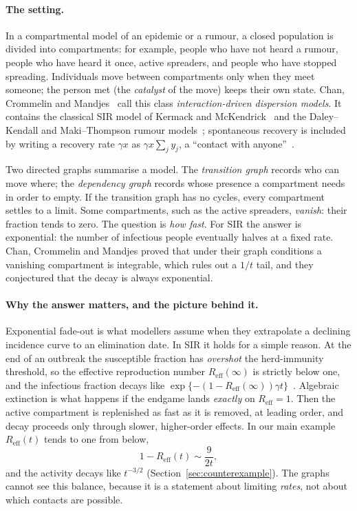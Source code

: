 \documentclass[11pt,a4paper]{article}
\theoremstyle{definition}\newtheorem{definition}[theorem]{Definition}
\theoremstyle{remark}\newtheorem{remark}[theorem]{Remark}
\begin{document}
\paragraph{The setting.}
In a compartmental model of an epidemic or a rumour, a closed population
is divided into compartments: for example, people who have not heard a
rumour, people who have heard it once, active spreaders, and people who
have stopped spreading. Individuals move between compartments only when
they meet someone; the person met (the \emph{catalyst} of the move) keeps
their own state. Chan, Crommelin and Mandjes~\cite{CCM} call this class
\emph{interaction-driven dispersion models}. It contains the classical
SIR model of Kermack and McKendrick~\cite{KermackMcKendrick} and the
Daley--Kendall and Maki--Thompson rumour models~\cite{DaleyKendall,MakiThompson}; spontaneous recovery is
included by writing a recovery rate $\gamma x$ as $\gamma x\sum_j y_j$,
a ``contact with anyone''~\cite[eq.~(8), p.~9]{CCM}.

Two directed graphs summarise a model. The \emph{transition graph}
records who can move where; the \emph{dependency graph} records whose
presence a compartment needs in order to empty. If the transition graph
has no cycles, every compartment settles to a limit. Some compartments,
such as the active spreaders, \emph{vanish}: their fraction tends to
zero. The question is \emph{how fast}. For SIR the answer is
exponential: the number of infectious people eventually halves at a
fixed rate. Chan, Crommelin and Mandjes proved that under their graph
conditions a vanishing compartment is integrable, which rules out a
$1/t$ tail, and they conjectured that the decay is always exponential.

\paragraph{Why the answer matters, and the picture behind it.}
Exponential fade-out is what modellers assume when they extrapolate a
declining incidence curve to an elimination date. In SIR it holds for a
simple reason. At the end of an outbreak the susceptible fraction has
\emph{overshot} the herd-immunity threshold, so the effective
reproduction number $R_{\mathrm{eff}}(\infty)$ is strictly below one,
and the infectious fraction decays like
$\exp\{-(1-R_{\mathrm{eff}}(\infty))\gamma t\}$~\cite{Hethcote,DiekmannHeesterbeekBritton}.
Algebraic extinction is what happens if the endgame lands
\emph{exactly} on $R_{\mathrm{eff}}=1$. Then the active compartment is
replenished as fast as it is removed, at leading order, and decay
proceeds only through slower, higher-order effects.
In our main example $R_{\mathrm{eff}}(t)$ tends to one from below,
\[
1-R_{\mathrm{eff}}(t)\sim\frac{9}{2t},
\]
and the activity decays like $t^{-3/2}$ (Section~\ref{sec:counterexample}).
The graphs cannot see this balance, because it is a statement about
limiting \emph{rates}, not about which contacts are possible.
\end{document}
